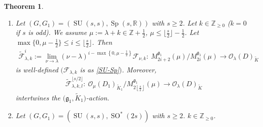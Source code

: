 \documentclass[pdftex]{sigma}
\numberwithin{equation}{section}
\newtheorem{Theorem}{Theorem}[section]
\newcommand{\BZ}{\mathbb{Z}}
\newcommand{\BR}{\mathbb{R}}
\newcommand{\fg}{\mathfrak{g}}
\newcommand{\cF}{\mathcal{F}}
\newcommand{\cO}{\mathcal{O}}
\begin{document}
\begin{Theorem}
\begin{enumerate}
Let $\max\big\{0,\big\lfloor \frac{\mu}{2}\big\rfloor\big\}\le i\le \big\lfloor\frac{s'}{2}\big\rfloor$. Then
\begin{gather*} \tilde{\cF}_{\lambda,k,l}^i:=\lim_{\nu\to\lambda} (\nu-\lambda)^{i-\max\left\{0,\left\lfloor\frac{\mu}{2}\right\rfloor\right\}}\cF_{\nu,k,l}
\colon \ M_{2i+2}^{\fg_1}(\mu)/M_{2i}^{\fg_1}(\mu)\longrightarrow \cO_\lambda(D)_{\tilde{K}} \end{gather*}
is well-defined $(\cF_{\lambda,k,l}$ is as \eqref{SO*-U}$)$. Moreover,
\begin{gather*} \tilde{\cF}_{\lambda,k,l}^{\lfloor s'/2\rfloor}\colon \
\cO_\mu(D_1)_{\tilde{K}_1}/M_{2\left\lfloor\frac{s'}{2}\right\rfloor}^{\fg_1}(\mu)\longrightarrow \cO_\lambda(D)_{\tilde{K}}, \end{gather*}
and the restriction
\begin{gather*} \tilde{\cF}_{\lambda,k,l}^i\colon \ M_{2i+1}^{\fg_1}(\mu)/M_{2i}^{\fg_1}(\mu)\longrightarrow \cO_\lambda(D)_{\tilde{K}}
\qquad \left(\max\left\{0,\left\lceil\frac{\mu}{2}\right\rceil\right\}\le i\le \left\lfloor\frac{s'}{2}\right\rfloor\right) \end{gather*}
intertwine the $(\fg_1,\tilde{K}_1)$-action. $($We note that $M_{2\left\lfloor\frac{\mu}{2}\right\rfloor+1}^{\fg_1}(\mu)=\{0\}$
for $\mu=1,3,\ldots,\allowbreak 2\big\lfloor \frac{s'}{2}\big\rfloor-1$,
and hence the restriction of $\tilde{\cF}_{\lambda,k,l}^{\lfloor \mu/2\rfloor}$ is trivial for these $\mu.)$
\item[$(3)$] Let $(G,G_1)=(\operatorname{SU}(s,s),\operatorname{Sp}(s,\BR))$ with $s\ge 2$. Let $k\in\BZ_{\ge 0}$ ($k=0$ if $s$ is odd).
We assume $\mu:=\lambda+k\in\BZ+\frac{1}{2}$, $\mu\le \big\lfloor \frac{s}{2}\big\rfloor-\frac{1}{2}$.
Let $\max\big\{0,\mu-\frac{1}{2}\big\}\le i\le \big\lfloor\frac{s}{2}\big\rfloor$. Then
\begin{gather*} \tilde{\cF}_{\lambda,k}^i:=\lim_{\nu\to\lambda} (\nu-\lambda)^{i-\max\left\{0,\mu-\frac{1}{2}\right\}}\cF_{\nu,k}
\colon \ M_{2i+2}^{\fg_1}(\mu)/M_{2i}^{\fg_1}(\mu)\longrightarrow \cO_\lambda(D)_{\tilde{K}} \end{gather*}
is well-defined $(\cF_{\lambda,k}$ is as \eqref{SU-Sp}$)$. Moreover,
\begin{gather*} \tilde{\cF}_{\lambda,k,l}^{\lfloor s/2\rfloor}\colon \
\cO_\mu(D_1)_{\tilde{K}_1}/M_{2\left\lfloor\frac{s}{2}\right\rfloor}^{\fg_1}(\mu)\longrightarrow \cO_\lambda(D)_{\tilde{K}} \end{gather*}
intertwines the $\big(\fg_1,\tilde{K}_1\big)$-action.
\item[$(4)$] Let $(G,G_1)=(\operatorname{SU}(s,s),\operatorname{SO}^*(2s))$ with $s\ge 2$. $k\in\BZ_{\ge 0}$.

\end{enumerate}
\end{Theorem}
\end{document}
